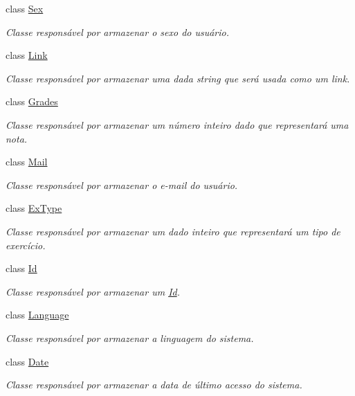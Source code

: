 \begin{DoxyCompactItemize}
class \hyperlink{classELO_1_1BaseUnit_1_1Sex}{Sex}
\begin{DoxyCompactList}\small\item\em Classe responsável por armazenar o sexo do usuário. \end{DoxyCompactList}\item 
class \hyperlink{classELO_1_1BaseUnit_1_1Link}{Link}
\begin{DoxyCompactList}\small\item\em Classe responsável por armazenar uma dada string que será usada como um link. \end{DoxyCompactList}\item 
class \hyperlink{classELO_1_1BaseUnit_1_1Grades}{Grades}
\begin{DoxyCompactList}\small\item\em Classe responsável por armazenar um número inteiro dado que representará uma nota. \end{DoxyCompactList}\item 
class \hyperlink{classELO_1_1BaseUnit_1_1Mail}{Mail}
\begin{DoxyCompactList}\small\item\em Classe responsável por armazenar o e-\/mail do usuário. \end{DoxyCompactList}\item 
class \hyperlink{classELO_1_1BaseUnit_1_1ExType}{Ex\-Type}
\begin{DoxyCompactList}\small\item\em Classe responsável por armazenar um dado inteiro que representará um tipo de exercício. \end{DoxyCompactList}\item 
class \hyperlink{classELO_1_1BaseUnit_1_1Id}{Id}
\begin{DoxyCompactList}\small\item\em Classe responsável por armazenar um \hyperlink{classELO_1_1BaseUnit_1_1Id}{Id}. \end{DoxyCompactList}\item 
class \hyperlink{classELO_1_1BaseUnit_1_1Language}{Language}
\begin{DoxyCompactList}\small\item\em Classe responsável por armazenar a linguagem do sistema. \end{DoxyCompactList}\item 
class \hyperlink{classELO_1_1BaseUnit_1_1Date}{Date}
\begin{DoxyCompactList}\small\item\em Classe responsável por armazenar a data de último acesso do sistema. \end{DoxyCompactList}\end{DoxyCompactItemize}

